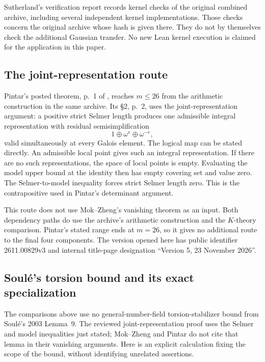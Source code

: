 Sutherland's verification report \cite{Sutherland} records
kernel checks of the original combined archive, including
several independent kernel implementations. Those checks
concern the original archive whose hash is given there.
They do not by themselves check the additional Gaussian
transfer. No new Lean kernel execution is claimed for the
application in this paper.

\subsection{The joint-representation route}

Pintar's posted theorem, p.~1 of \cite{Pintar}, reaches
$m\leq26$ from the arithmetic construction in the same
archive. Its \S2, p.~2, uses the joint-representation
argument: a positive strict Selmer length produces one
admissible integral representation with residual
semisimplification
\[
                 1\oplus\omega^e\oplus\omega^{-e},
\]
valid simultaneously at every Galois element. The logical
map can be stated directly. An admissible local point gives
such an integral representation. If there are no such
representations, the space of local points is empty.
Evaluating the model upper bound at the identity then has
empty covering set and value zero. The Selmer-to-model
inequality forces strict Selmer length zero. This is the
contrapositive used in Pintar's determinant argument.

This route does not use Mok--Zheng's vanishing theorem as
an input. Both dependency paths do use the archive's
arithmetic construction and the $K$-theory comparison.
Pintar's stated range ends at $m=26$, so it gives no
additional route to the final four components. The version
opened here has public identifier 2611.00829v3 and internal
title-page designation ``Version 5, 23 November 2026''.

\subsection{Soul\'e's torsion bound and its exact specialization}

The comparisons above use no general-number-field
torsion-stabilizer bound from Soul\'e's 2003 Lemma~9.
The reviewed joint-representation proof uses the Selmer
and model inequalities just stated; Mok--Zheng and Pintar
do not cite that lemma in their vanishing arguments.
Here is an explicit calculation fixing the scope of the
bound, without identifying unrelated assertions.

